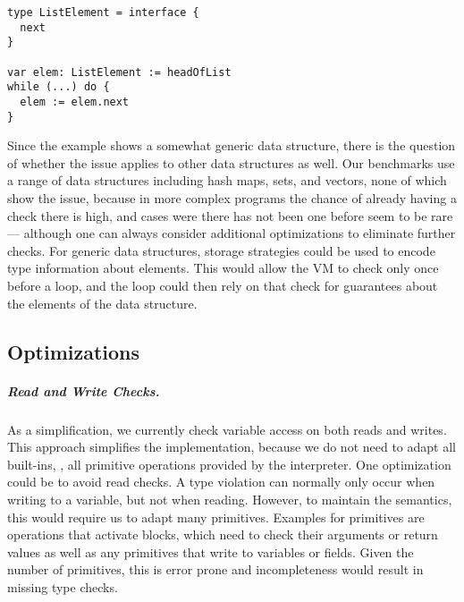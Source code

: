 \begin{lstlisting}[caption={Example for dynamic type checks not corresponding to existing checks.},%
  escapechar=|,label={ex:pathological-case},%
  float,floatplacement=htb]
type ListElement = interface {
  next
}

var elem: ListElement := headOfList
while (...) do {
  elem := elem.next
}
\end{lstlisting}

Since the example shows a somewhat generic data structure,
there is the question of whether the issue applies to other data structures as
well.
Our benchmarks use a range of data structures including hash maps, sets,
and vectors, none of which show the issue, because in more complex programs
the chance of already having a check there is high,
and cases were there has not been one before seem to be rare --- although
one can always consider additional optimizations
to eliminate further checks.
For generic data structures, storage strategies\citep{Bolz2013}
could be used to encode type information about elements.
This would allow the VM to check only once before a loop,
and the loop could then rely on that check for guarantees
about the elements of the data structure.


\subsection{Optimizations}
\label{sec:discussion-opt}


\subparagraph{Read and Write Checks.}
\label{sec:discussion-read-write}

As a simplification, we currently check variable access
on both reads and writes.
This approach simplifies the implementation, because we do not need to
adapt all built-ins, \ie,
all primitive operations provided by the interpreter.
One optimization could be to avoid read checks.
A type violation can normally only occur when writing to a variable,
but not when reading.
However, to maintain the semantics, this would require us to adapt
many primitives.
Examples for primitives are operations that activate blocks,
which need to check their arguments or return values
as well as any primitives that write to variables or fields.
Given the number of primitives, this is error prone
and incompleteness would result in missing type checks.

